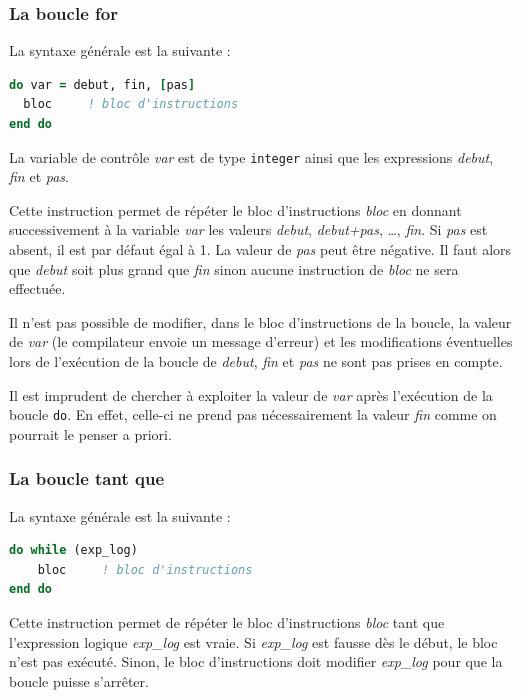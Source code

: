 \documentclass[a4paper,twoside]{article}
\begin{document}
\subsubsection{La boucle for}
La syntaxe générale est la suivante :
\begin{lstlisting}[language=Fortran]
do var = debut, fin, [pas] 
  bloc     ! bloc d'instructions 
end do
\end{lstlisting}

La variable de contrôle \emph{var} est de type \texttt{integer} ainsi que les expressions \emph{debut}, \emph{fin} et \emph{pas}.

Cette instruction permet de répéter le bloc d'instructions \emph{bloc} en donnant successivement à la variable \emph{var} les valeurs \emph{debut}, \emph{debut+pas}, \ldots, \emph{fin}. Si \emph{pas} est absent, il est par défaut égal à 1. La valeur de \emph{pas} peut être négative. Il faut alors que \emph{debut} soit plus grand que \emph{fin} sinon aucune instruction de \emph{bloc} ne sera effectuée. 

\begin{attention}
Il n'est pas possible de modifier, dans le bloc d'instructions de la boucle, la valeur de \emph{var} (le compilateur envoie un message d'erreur) et les modifications éventuelles lors de l'exécution de la boucle de \emph{debut}, \emph{fin} et \emph{pas} ne sont pas prises en compte. 

Il est imprudent de chercher à exploiter la valeur de \emph{var} après l'exécution de la boucle \texttt{do}. En effet, celle-ci ne prend pas nécessairement la valeur \emph{fin} comme on pourrait le penser a priori.
\end{attention}


\subsubsection{La boucle tant que}

La syntaxe générale est la suivante :
\begin{lstlisting}[language=Fortran]
do while (exp_log) 
    bloc     ! bloc d'instructions 
end do
\end{lstlisting}

Cette instruction permet de répéter le bloc d'instructions \emph{bloc} tant que l'expression logique \emph{exp\_log} est vraie. Si \emph{exp\_log} est fausse dès le début, le bloc n'est pas exécuté. Sinon, le bloc d'instructions doit modifier \emph{exp\_log} pour que la boucle puisse s'arrêter.
\end{document}
